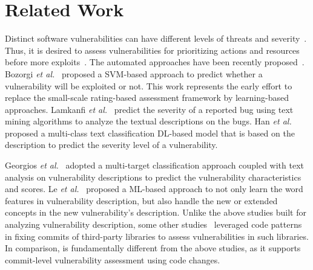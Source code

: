 \section{Related Work}


Distinct software vulnerabilities can have different levels of threats
and severity~\cite{nayak2014some,le2019automated}. Thus, it is desired
to assess vulnerabilities for prioritizing actions and resources
before more exploits~\cite{khan2018review}.  The automated approaches
have been recently
proposed~\cite{bozorgi2010beyond,allodi2014comparing,deepCVA-ase21}.
Bozorgi {\em et al.}~\cite{bozorgi2010beyond} proposed a SVM-based
approach to predict whether a vulnerability will be exploited or
not.
This work represents the early effort to replace the small-scale
rating-based assessment framework by learning-based approaches.
Lamkanfi {\em et al.}~\cite{lamkanfi2010predicting} predict the
severity of a reported bug using text mining algorithms to analyze the
textual descriptions on the bugs.
%
Han {\em et al.}~\cite{han2017learning} proposed a multi-class text
classification DL-based model that is based on the
description to predict the severity level of a vulnerability.

Georgios {\em et al.}~\cite{spanos2018multi} adopted a multi-target
classification approach coupled with text analysis on vulnerability
descriptions to predict the vulnerability characteristics and scores.
Le {\em et al.}~\cite{le2019automated} proposed a ML-based approach to
not only learn the word features in vulnerability description, but
also handle the new or extended concepts in the new vulnerability's
description. Unlike the above studies built for analyzing
vulnerability description, some other
studies~\cite{ponta2018beyond,ponta2020detection} leveraged code
patterns in fixing commits of third-party libraries to assess
vulnerabilities in such libraries. In comparison, {\tool} is
fundamentally different from the above studies, as it supports
commit-level vulnerability assessment using code changes.

